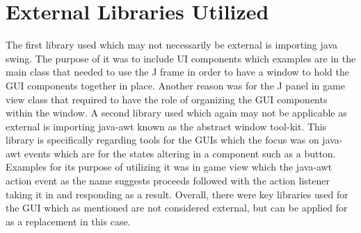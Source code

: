 \documentclass[12pt,letterpaper]{article}
\begin{document}
\section{External Libraries Utilized}
The first library used which may not necessarily be external is importing java swing. The purpose of it was to include UI components which examples are in the main class that needed to use the J frame in order to have a window to hold the GUI components together in place. Another reason was for the J panel in game view class that required to have the role of organizing the GUI components within the window. A second library used which again may not be applicable as external is importing java-awt known as the abstract window tool-kit. This library is specifically regarding tools for the GUIs which the focus was on java-awt events which are for the states altering in a component such as a button. Examples for its purpose of utilizing it was in game view which the java-awt action event as the name suggests proceeds followed with the action listener taking it in and responding as a result. Overall, there were key libraries used for the GUI which as mentioned are not considered external, but can be applied for as a replacement in this case.

\end{document}
